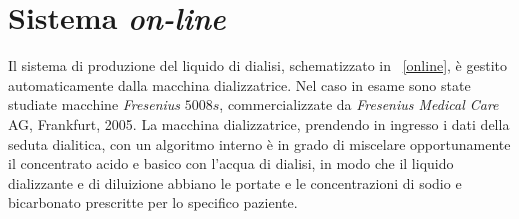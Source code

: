 \section{Sistema \textit{on-line} }

Il sistema di produzione del liquido di dialisi, schematizzato in \figurename~\ref{online}, è gestito automaticamente dalla macchina dializzatrice. Nel caso in esame sono state studiate macchine \textit{Fresenius} $5008s$, commercializzate da \textit{Fresenius Medical Care} AG, Frankfurt, 2005. La macchina dializzatrice, prendendo in ingresso i dati della seduta dialitica, con un algoritmo interno è in grado di miscelare opportunamente il concentrato acido e basico con l'acqua di dialisi, in modo che il liquido dializzante e di diluizione abbiano le portate e le concentrazioni di sodio e bicarbonato prescritte per lo specifico paziente.

